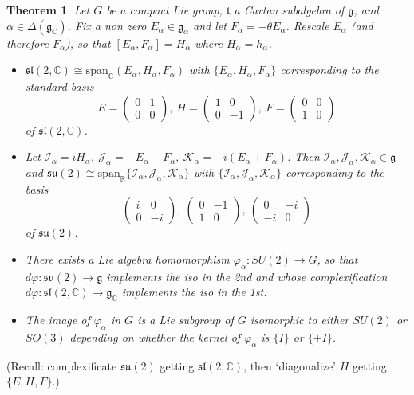 \documentclass{article}
\theoremstyle{definition}
\theoremstyle{plain}
\newtheorem{theorem}[definition]{Theorem}
\begin{document}
\begin{theorem}
    Let $ G $ be a compact Lie group, $ \mathfrak{t} $ a Cartan subalgebra of $ \mathfrak{g} $, and $ \alpha\in\Delta(\mathfrak{g}_{\mathbb{C} }) $. Fix a non zero $ E_{\alpha}\in\mathfrak{g}_{\alpha} $ and let $ F_{\alpha}=-\theta E_{\alpha} $. Rescale $ E_{\alpha} $ (and therefore $ F_{\alpha} $), so that $ [E_{\alpha},F_{\alpha}]=H_{\alpha} $ where $ H_{\alpha}=h_{\alpha} $.
    \begin{itemize}
        \item $ \mathfrak{sl}(2,\mathbb{C})\cong \text{span}_{\mathbb{C} }(E_{\alpha},H_{\alpha},F_{\alpha}) $ with $ \{E_{\alpha},H_{\alpha},F_{\alpha}\} $ corresponding to the standard basis\[
            E=\left(\begin{matrix}
            0 & 1 \\ 0 & 0
            \end{matrix}\right),\ H=\left(\begin{matrix}
            1 & 0 \\ 0 & -1 
            \end{matrix}\right),\ F=\left(\begin{matrix}
            0 & 0\\ 1 & 0 
            \end{matrix}\right)
        \]of $ \mathfrak{sl}(2,\mathbb{C} ) $.
        \item Let $ \mathcal{I}_{\alpha}=iH_{\alpha},\ \mathcal{J}_{\alpha}=-E_{\alpha}+F_{\alpha},\ \mathcal{K}_{\alpha}=-i(E_{\alpha}+F_{\alpha}) $. Then $ \mathcal{I}_{\alpha},\mathcal{J}_{\alpha},\mathcal{K}_{\alpha}\in\mathfrak{g} $ and $ \mathfrak{su}(2)\cong\mathrm{span}_{\mathbb{R}}\{\mathcal{I}_{\alpha},\mathcal{J}_{\alpha},\mathcal{K}_{\alpha}\} $ with $ \{\mathcal{I}_{\alpha},\mathcal{J}_{\alpha},\mathcal{K}_{\alpha}\} $ corresponding to the basis\[
            \left(\begin{matrix}
            i & 0 \\ 0 & -i
            \end{matrix}\right),\ \left(\begin{matrix}
            0 & -1 \\ 1 & 0
            \end{matrix}\right),\ \left(\begin{matrix}
            0 & -i \\ -i & 0
            \end{matrix}\right)
        \]of $ \mathfrak{su}(2) $.
        \item There exists a Lie algebra homomorphism $ \varphi_{\alpha}:SU(2)\rightarrow G $, so that $ d\varphi:\mathfrak{su}(2)\rightarrow \mathfrak{g} $ implements the iso in the 2nd and whose complexification $ d\varphi:\mathfrak{sl}(2,\mathbb{C} )\rightarrow \mathfrak{g}_{\mathbb{C} } $ implements the iso in the 1st.
        \item The image of $ \varphi_{\alpha} $ in $ G $ is a Lie subgroup of $ G $ isomorphic to either $ SU(2) $ or $ SO(3) $ depending on whether the kernel of $ \varphi_{\alpha} $ is $ \{I\} $ or $ \{\pm I\} $.
    \end{itemize}
\end{theorem}

(Recall: complexificate $ \mathfrak{su}(2) $ getting $ \mathfrak{sl}(2,\mathbb{C} ) $, then `diagonalize' $ H $ getting $ \{E,H,F\} $.)
\end{document}
